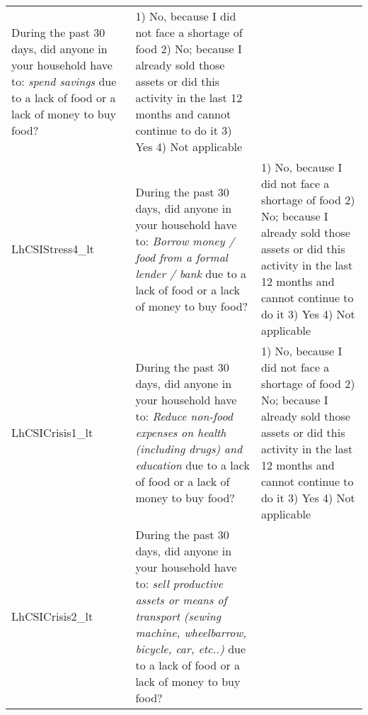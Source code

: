 \documentclass[
]{article}
\begin{document}
\begin{longtable}[]{@{}lll@{}}
\begin{minipage}[t]{0.49\columnwidth}
During the past 30 days, did anyone in your household have to: \emph{spend savings} due to a lack of food or a lack of money to buy food?\strut
\end{minipage} & \begin{minipage}[t]{0.27\columnwidth}\raggedright
1) No, because I did not face a shortage of food 2) No; because I already sold those assets or did this activity in the last 12 months and cannot continue to do it 3) Yes 4) Not applicable\strut
\end{minipage}\tabularnewline
\begin{minipage}[t]{0.15\columnwidth}\raggedright
LhCSIStress4\_lt\strut
\end{minipage} & \begin{minipage}[t]{0.49\columnwidth}\raggedright
During the past 30 days, did anyone in your household have to: \emph{Borrow money / food from a formal lender / bank} due to a lack of food or a lack of money to buy food?\strut
\end{minipage} & \begin{minipage}[t]{0.27\columnwidth}\raggedright
1) No, because I did not face a shortage of food 2) No; because I already sold those assets or did this activity in the last 12 months and cannot continue to do it 3) Yes 4) Not applicable\strut
\end{minipage}\tabularnewline
\begin{minipage}[t]{0.15\columnwidth}\raggedright
LhCSICrisis1\_lt\strut
\end{minipage} & \begin{minipage}[t]{0.49\columnwidth}\raggedright
During the past 30 days, did anyone in your household have to: \emph{Reduce non-food expenses on health (including drugs) and education } due to a lack of food or a lack of money to buy food?\strut
\end{minipage} & \begin{minipage}[t]{0.27\columnwidth}\raggedright
1) No, because I did not face a shortage of food 2) No; because I already sold those assets or did this activity in the last 12 months and cannot continue to do it 3) Yes 4) Not applicable\strut
\end{minipage}\tabularnewline
\begin{minipage}[t]{0.15\columnwidth}\raggedright
LhCSICrisis2\_lt\strut
\end{minipage} & \begin{minipage}[t]{0.49\columnwidth}\raggedright
During the past 30 days, did anyone in your household have to: \emph{sell productive assets or means of transport (sewing machine, wheelbarrow, bicycle, car, etc..)} due to a lack of food or a lack of money to buy food?\strut

\end{minipage}
\end{longtable}
\end{document}
